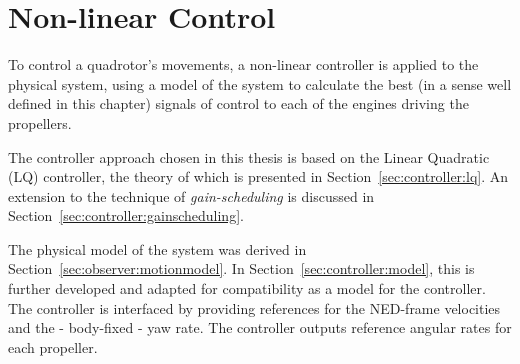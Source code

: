 \chapter{Non-linear Control}
\label{cha:controller}
    To control a quadrotor's movements, a non-linear controller is applied to the
    physical system, using a model of the system to calculate the best
    (in a sense well defined in this chapter) signals of control to each
    of the engines driving the propellers.

    The controller approach chosen in this thesis is based on the Linear Quadratic (LQ)
    controller, the theory of which is presented in Section~\ref{sec:controller:lq}.
    An extension to the technique of \textit{gain-scheduling} is discussed
    in Section~\ref{sec:controller:gainscheduling}.

    The physical model of the system was derived in Section~\ref{sec:observer:motionmodel}.
    In Section~\ref{sec:controller:model}, this is further developed
    and adapted for compatibility as a model for the controller.
    The controller is interfaced by providing references
    for the NED-frame velocities and the - body-fixed - yaw rate.
    The controller outputs reference angular rates for each propeller.

    
    
    
